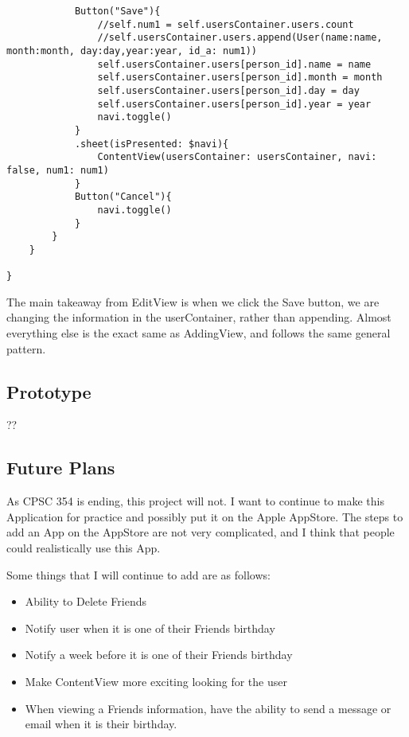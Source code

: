 \documentclass{article}
\theoremstyle{theorem}
\theoremstyle{definition}
\theoremstyle{remark}
\begin{document}
\begin{verbatim}
            Button("Save"){
                //self.num1 = self.usersContainer.users.count
                //self.usersContainer.users.append(User(name:name, month:month, day:day,year:year, id_a: num1))
                self.usersContainer.users[person_id].name = name
                self.usersContainer.users[person_id].month = month
                self.usersContainer.users[person_id].day = day
                self.usersContainer.users[person_id].year = year
                navi.toggle()
            }
            .sheet(isPresented: $navi){
                ContentView(usersContainer: usersContainer, navi: false, num1: num1)
            }
            Button("Cancel"){
                navi.toggle()
            }
        }
    }
    
}

\end{verbatim}

The main takeaway from EditView is when we click the Save button, we are changing the information in the userContainer, rather than appending. Almost everything else is the exact same as AddingView, and follows the same general pattern.

\subsection{Prototype}
??
\subsection{Future Plans}
As CPSC 354 is ending, this project will not. I want to continue to make this Application for practice and possibly put it on the Apple AppStore. The steps to add an App on the AppStore are not very complicated, and I think that people could realistically use this App. 

\noindent\newline Some things that I will continue to add are as follows:
\begin{itemize}
  \item Ability to Delete Friends
  \item Notify user when it is one of their Friends birthday
  \item Notify a week before it is one of their Friends birthday
  \item Make ContentView more exciting looking for the user
  \item When viewing a Friends information, have the ability to send a message or email when it is their birthday.
\end{itemize}
\end{document}

